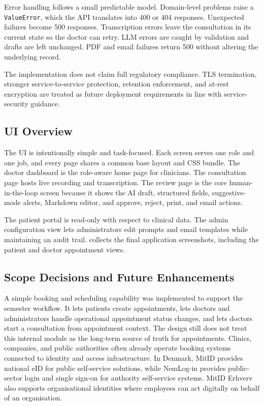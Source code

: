 Error handling follows a small predictable model. Domain-level problems raise a \texttt{ValueError}, which the API translates into 400 or 404 responses. Unexpected failures become 500 responses. Transcription errors leave the consultation in its current state so the doctor can retry. LLM errors are caught by validation and drafts are left unchanged. PDF and email failures return 500 without altering the underlying record.

The implementation does not claim full regulatory compliance. TLS termination, stronger service-to-service protection, retention enforcement, and at-rest encryption are treated as future deployment requirements in line with service-security guidance.

\subsection{UI Overview}
\label{subsec:ui-overview}

The UI is intentionally simple and task-focused. Each screen serves one role and one job, and every page shares a common base layout and CSS bundle. The doctor dashboard is the role-aware home page for clinicians. The consultation page hosts live recording and transcription. The review page is the core human-in-the-loop screen because it shows the AI draft, structured fields, suggestive-mode alerts, Markdown editor, and approve, reject, print, and email actions.

The patient portal is read-only with respect to clinical data. The admin configuration view lets administrators edit prompts and email templates while maintaining an audit trail.  collects the final application screenshots, including the patient and doctor appointment views.

\subsection{Scope Decisions and Future Enhancements}
\label{subsec:scope-decisions}

A simple booking and scheduling capability was implemented to support the semester workflow. It lets patients create appointments, lets doctors and administrators handle operational appointment status changes, and lets doctors start a consultation from appointment context. The design still does not treat this internal module as the long-term source of truth for appointments. Clinics, companies, and public authorities often already operate booking systems connected to identity and access infrastructure. In Denmark, MitID provides national eID for public self-service solutions, while NemLog-in provides public-sector login and single sign-on for authority self-service systems. MitID Erhverv also supports organisational identities where employees can act digitally on behalf of an organisation.

